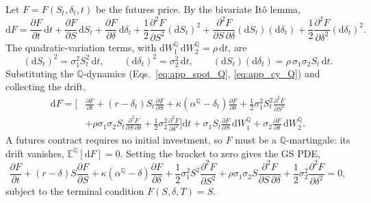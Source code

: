 \documentclass[11pt, a4paper]{article}
\newcommand{\convyield}{\delta}             %
\newcommand{\meanrev}{\kappa}               %
\newcommand{\longrun}{\alpha}               %
\begin{document}
Let $F = F(S_t, \convyield_t, t)$ be the futures price. By the bivariate It\^{o} lemma,
\begin{equation}
  \label{eq:app_ito}
  \mathrm{d}F = \frac{\partial F}{\partial t}\,\mathrm{d}t
    + \frac{\partial F}{\partial S}\,\mathrm{d}S_t
    + \frac{\partial F}{\partial \convyield}\,\mathrm{d}\convyield_t
    + \frac{1}{2}\frac{\partial^2 F}{\partial S^2}(\mathrm{d}S_t)^2
    + \frac{\partial^2 F}{\partial S\,\partial \convyield}(\mathrm{d}S_t)(\mathrm{d}\convyield_t)
    + \frac{1}{2}\frac{\partial^2 F}{\partial \convyield^2}(\mathrm{d}\convyield_t)^2.
\end{equation}
\noindent
The quadratic-variation terms, with $\mathrm{d}W_1^{\mathbb{Q}}\,\mathrm{d}W_2^{\mathbb{Q}} = \rho\,\mathrm{d}t$, are
\begin{equation}
  \label{eq:app_qv}
  (\mathrm{d}S_t)^2 = \sigma_1^2 S_t^2\,\mathrm{d}t,
  \qquad
  (\mathrm{d}\convyield_t)^2 = \sigma_2^2\,\mathrm{d}t,
  \qquad
  (\mathrm{d}S_t)(\mathrm{d}\convyield_t) = \rho\,\sigma_1\sigma_2 S_t\,\mathrm{d}t.
\end{equation}
\noindent
Substituting the $\mathbb{Q}$-dynamics (Eqs.~\ref{eq:app_spot_Q}, \ref{eq:app_cy_Q}) and collecting the drift,
\begin{equation}
  \label{eq:app_dF}
  \begin{aligned}
  \mathrm{d}F = \Bigg[
    &\frac{\partial F}{\partial t}
    + (r - \convyield_t)S_t\frac{\partial F}{\partial S}
    + \meanrev(\longrun^{\mathbb{Q}} - \convyield_t)\frac{\partial F}{\partial \convyield}
    + \frac{1}{2}\sigma_1^2 S_t^2\frac{\partial^2 F}{\partial S^2} \\
    &+ \rho\sigma_1\sigma_2 S_t\frac{\partial^2 F}{\partial S\,\partial \convyield}
    + \frac{1}{2}\sigma_2^2\frac{\partial^2 F}{\partial \convyield^2}
  \Bigg]\mathrm{d}t
  + \sigma_1 S_t\frac{\partial F}{\partial S}\,\mathrm{d}W_1^{\mathbb{Q}}
  + \sigma_2\frac{\partial F}{\partial \convyield}\,\mathrm{d}W_2^{\mathbb{Q}}.
  \end{aligned}
\end{equation}
\noindent
A futures contract requires no initial investment, so $F$ must be a $\mathbb{Q}$-martingale: its drift vanishes, $\mathbb{E}^{\mathbb{Q}}[\mathrm{d}F] = 0$. Setting the bracket to zero gives the GS PDE,
\begin{equation}
  \label{eq:app_pde_calendar}
  \frac{\partial F}{\partial t}
  + (r - \convyield)S\frac{\partial F}{\partial S}
  + \meanrev(\longrun^{\mathbb{Q}} - \convyield)\frac{\partial F}{\partial \convyield}
  + \frac{1}{2}\sigma_1^2 S^2\frac{\partial^2 F}{\partial S^2}
  + \rho\sigma_1\sigma_2 S\frac{\partial^2 F}{\partial S\,\partial \convyield}
  + \frac{1}{2}\sigma_2^2\frac{\partial^2 F}{\partial \convyield^2} = 0,
\end{equation}
\noindent
subject to the terminal condition $F(S, \convyield, T) = S$.
\end{document}
